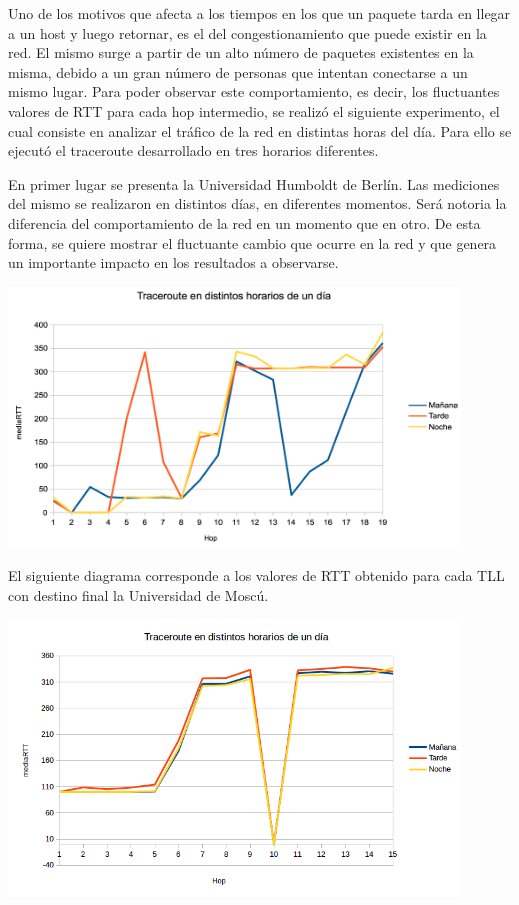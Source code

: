 Uno de los motivos que afecta a los tiempos en los que un paquete tarda en llegar a un host y luego retornar, es el del congestionamiento que puede existir en la red. El mismo surge a partir de un alto número de paquetes existentes en la misma, debido a un gran número de personas que intentan conectarse a un mismo lugar. Para poder observar este comportamiento, es decir, los fluctuantes valores de RTT para cada hop intermedio, se realizó el siguiente experimento, el cual consiste en analizar el tráfico de la red en distintas horas del día. Para ello se ejecutó el traceroute desarrollado en tres horarios diferentes. 

En primer lugar se presenta la Universidad Humboldt de Berlín. Las mediciones del mismo se realizaron en distintos días, en diferentes momentos. Será notoria la diferencia del comportamiento de la red en un momento que en otro. De esta forma, se quiere mostrar el fluctuante cambio que ocurre en la red y que genera un importante impacto en los resultados a observarse. 

\centerline{\includegraphics[width=0.9\textwidth]{imagenes/1ra_parte/trace_distintos_horarios_alemania.png}}

El siguiente diagrama corresponde a los valores de RTT obtenido para cada TLL con destino final la Universidad de Moscú.

\centerline{\includegraphics[width=0.9\textwidth]{imagenes/1ra_parte/trace_distintos_horarios_rusia.png}}

